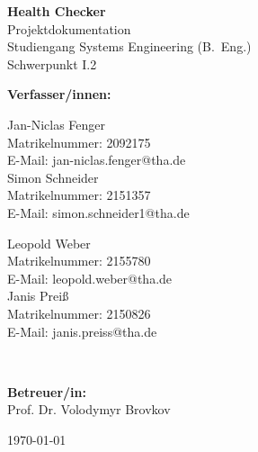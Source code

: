 \documentclass[a4paper,12pt,ngerman]{article}
\begin{document}
	
	\begin{titlepage}
		\centering
		\vspace*{1cm}
		
		{\LARGE \textbf{Health Checker}}\\[1cm]
		
		{\large Projektdokumentation}\\[1.0cm]
		{\large Studiengang Systems Engineering (B.~Eng.)}\\[0.3cm]
		{\large Schwerpunkt I.2}\\[1.5cm]
		
		\vfill
    
		\textbf{Verfasser/innen:}\\[1cm]
    	\begin{center}
		\begin{minipage}[t]{0.45\textwidth}
        \raggedright
        Jan-Niclas Fenger \\
        Matrikelnummer: 2092175 \\
        E-Mail: jan-niclas.fenger@tha.de \\[0.5cm]
		
        Simon Schneider \\
        Matrikelnummer: 2151357 \\
        E-Mail: simon.schneider1@tha.de
		\end{minipage}
		\hfill
		\begin{minipage}[t]{0.45\textwidth}
        \raggedright
        Leopold Weber \\
        Matrikelnummer: 2155780 \\
        E-Mail: leopold.weber@tha.de \\[0.5cm]
    
        Janis Preiß \\
        Matrikelnummer: 2150826 \\
        E-Mail: janis.preiss@tha.de
		\end{minipage}
		\\[1.5cm]
		\end{center}
		
		\textbf{Betreuer/in:}\\[0.5cm]
		Prof. Dr. Volodymyr Brovkov\\[3cm]
		
		\vfill
		
		{\large \today}
		
		\thispagestyle{empty} %
	\end{titlepage}
	
	\newpage
	\setcounter{page}{2}   %
	\tableofcontents
	\thispagestyle{plain}  %
	
	\newpage

	
\end{document}
